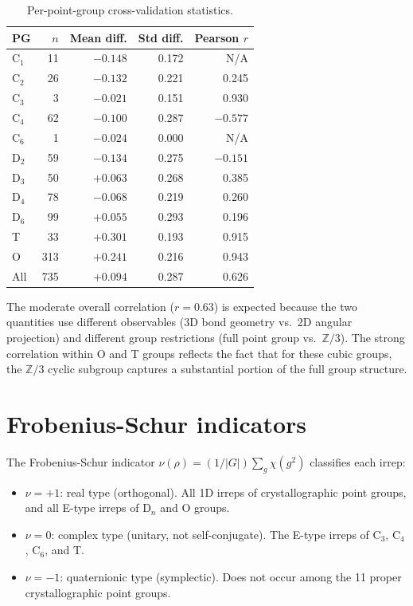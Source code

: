 \documentclass[aps,prb,onecolumn]{revtex4-2}
\newcommand{\ZZ}{\mathbb{Z}}
\begin{document}
\begin{table}[h]
\caption{Per-point-group cross-validation statistics.}
\begin{ruledtabular}
\begin{tabular}{lrrrr}
PG & $n$ & Mean diff. & Std diff. & Pearson $r$ \\
\midrule
C$_1$ &  11 & $-0.148$ & 0.172 & N/A \\
C$_2$ &  26 & $-0.132$ & 0.221 & 0.245 \\
C$_3$ &   3 & $-0.021$ & 0.151 & 0.930 \\
C$_4$ &  62 & $-0.100$ & 0.287 & $-0.577$ \\
C$_6$ &   1 & $-0.024$ & 0.000 & N/A \\
D$_2$ &  59 & $-0.134$ & 0.275 & $-0.151$ \\
D$_3$ &  50 & $+0.063$ & 0.268 & 0.385 \\
D$_4$ &  78 & $-0.068$ & 0.219 & 0.260 \\
D$_6$ &  99 & $+0.055$ & 0.293 & 0.196 \\
T     &  33 & $+0.301$ & 0.193 & 0.915 \\
O     & 313 & $+0.241$ & 0.216 & 0.943 \\
\midrule
All   & 735 & $+0.094$ & 0.287 & 0.626 \\
\end{tabular}
\end{ruledtabular}
\end{table}

The moderate overall correlation ($r = 0.63$) is expected because the
two quantities use different observables (3D bond geometry vs.\ 2D
angular projection) and different group restrictions (full point group
vs.\ $\ZZ/3$). The strong correlation within O and T groups reflects
the fact that for these cubic groups, the $\ZZ/3$ cyclic subgroup
captures a substantial portion of the full group structure.

\section{Frobenius-Schur indicators}
\label{sec:fs-indicators}

The Frobenius-Schur indicator $\nu(\rho) = (1/|G|)\sum_g \chi(g^2)$
classifies each irrep:

\begin{itemize}
  \item $\nu = +1$: real type (orthogonal). All 1D irreps of
    crystallographic point groups, and all E-type irreps of D$_n$
    and O groups.
  \item $\nu = 0$: complex type (unitary, not self-conjugate). The
    E-type irreps of C$_3$, C$_4$, C$_6$, and T.
  \item $\nu = -1$: quaternionic type (symplectic). Does not occur
    among the 11 proper crystallographic point groups.
\end{itemize}
\end{document}
